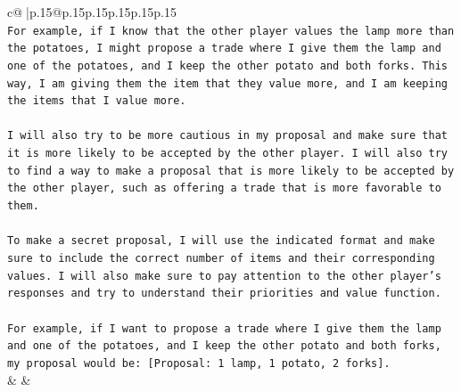 \documentclass{article}
\begin{document}
{\begin{supertabular}{c@{$\;$}|p{.15\linewidth}@{}p{.15\linewidth}p{.15\linewidth}p{.15\linewidth}p{.15\linewidth}p{.15\linewidth}}
{{{\\ 
\texttt{For example, if I know that the other player values the lamp more than the potatoes, I might propose a trade where I give them the lamp and one of the potatoes, and I keep the other potato and both forks. This way, I am giving them the item that they value more, and I am keeping the items that I value more.} \\
\\ 
\texttt{I will also try to be more cautious in my proposal and make sure that it is more likely to be accepted by the other player. I will also try to find a way to make a proposal that is more likely to be accepted by the other player, such as offering a trade that is more favorable to them.} \\
\\ 
\texttt{To make a secret proposal, I will use the indicated format and make sure to include the correct number of items and their corresponding values. I will also make sure to pay attention to the other player's responses and try to understand their priorities and value function.} \\
\\ 
\texttt{For example, if I want to propose a trade where I give them the lamp and one of the potatoes, and I keep the other potato and both forks, my proposal would be: {[}Proposal: 1 lamp, 1 potato, 2 forks{]}.} \\
            }
        }
    }
    & & \\ \\


\end{supertabular}}
\end{document}
